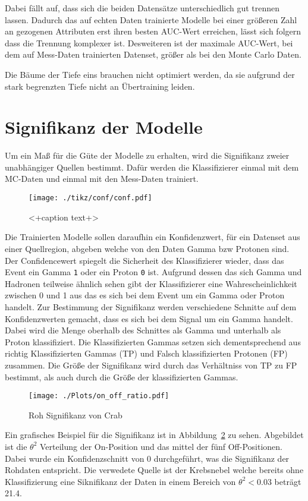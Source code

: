 Dabei fällt auf, dass sich die beiden Datensätze unterschiedlich gut trennen lassen.
Dadurch das auf echten Daten trainierte Modelle bei einer größeren Zahl an gezogenen Attributen erst ihren besten AUC-Wert erreichen, lässt sich folgern dass die Trennung komplexer ist.
Desweiteren ist der maximale AUC-Wert, bei dem auf Mess-Daten trainierten Datenset, größer als bei den Monte Carlo Daten. 

Die Bäume der Tiefe eins brauchen nicht optimiert werden, da sie aufgrund der stark begrenzten Tiefe nicht an Übertraining leiden.

\section{Signifikanz der Modelle}
Um ein Maß für die Güte der Modelle zu erhalten, wird die Signifikanz zweier unabhängiger Quellen bestimmt. 
Dafür werden die Klassifizierer einmal mit dem MC-Daten und einmal mit den Mess-Daten trainiert. 
\begin{figure}[H]
  \centering
  \texttt{[image: ./tikz/conf/conf.pdf]}
  \caption{<+caption text+>}
  \label{fig:<+label+>}
\end{figure}
Die Trainierten Modelle sollen daraufhin ein Konfidenzwert, für ein Datenset aus einer Quellregion, abgeben welche von den Daten Gamma bzw Protonen sind. 
Der Confidencewert spiegelt die Sicherheit des Klassifizierer wieder, dass das Event ein Gamma \texttt{1} oder ein Proton \texttt{0} ist. 
Aufgrund dessen das sich Gamma und Hadronen teilweise ähnlich sehen gibt der Klassifizierer eine Wahrescheinlichkeit zwischen 0 und 1 aus das es sich bei dem Event um ein Gamma oder Proton handelt.
Zur Bestimmung der Signifikanz werden verschiedene Schnitte auf dem Konfidenzwerten gemacht, dass es sich bei dem Signal um ein Gamma handelt.
Dabei wird die Menge oberhalb des Schnittes als Gamma und unterhalb als Proton klassifiziert. 
Die Klassifizierten Gammas setzen sich dementsprechend aus richtig Klassifizierten Gammas (TP) und Falsch klassifizierten Protonen (FP) zusammen. 
Die Größe der Signifikanz wird durch das Verhältniss von TP zu FP bestimmt, als auch durch die Größe der klassifizierten Gammas.

\begin{figure}[H]
  \centering
  \texttt{[image: ./Plots/on\_off\_ratio.pdf]}
  \caption{Roh Signifikanz von Crab}
  \label{fig:sig_crab}
\end{figure}
Ein grafisches Beispiel für die Signifikanz ist in Abbildung~\ref{fig:sig_crab} zu sehen. 
Abgebildet ist die $\theta^{2}$ Verteilung der On-Position und das mittel der fünf Off-Positionen.
Dabei wurde ein Konfidenzschnitt von 0 durchgeführt, was die Signifikanz der Rohdaten entspricht.
Die verwedete Quelle ist der Krebsnebel welche bereits ohne Klassifizierung eine Siknifikanz der Daten in einem Bereich von $\theta^{2} < 0.03$ beträgt \SI{21,4}{\sigma}.

